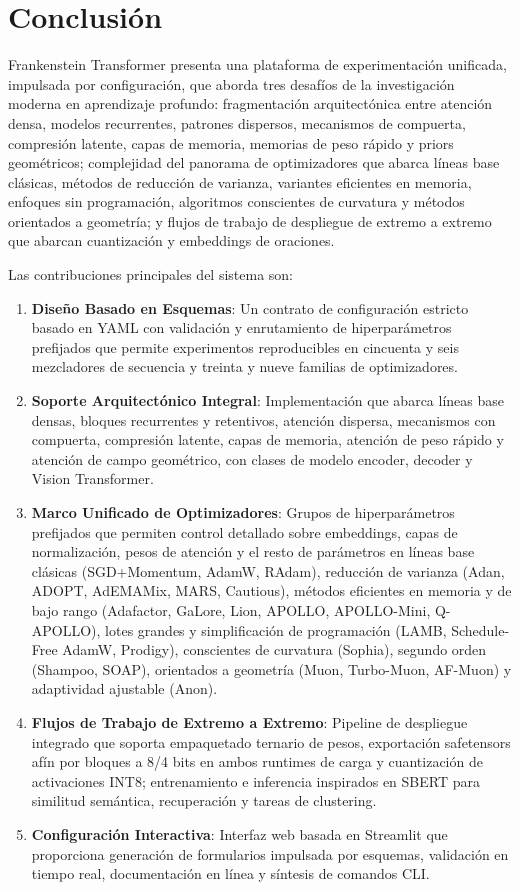 \section{Conclusión}
\label{sec:conclusion}

Frankenstein Transformer presenta una plataforma de experimentación unificada, impulsada por configuración, que aborda tres desafíos de la investigación moderna en aprendizaje profundo: fragmentación arquitectónica entre atención densa, modelos recurrentes, patrones dispersos, mecanismos de compuerta, compresión latente, capas de memoria, memorias de peso rápido y priors geométricos; complejidad del panorama de optimizadores que abarca líneas base clásicas, métodos de reducción de varianza, variantes eficientes en memoria, enfoques sin programación, algoritmos conscientes de curvatura y métodos orientados a geometría; y flujos de trabajo de despliegue de extremo a extremo que abarcan cuantización y embeddings de oraciones.

Las contribuciones principales del sistema son:
\begin{enumerate}[leftmargin=*]
    \item \textbf{Diseño Basado en Esquemas}: Un contrato de configuración estricto basado en YAML con validación y enrutamiento de hiperparámetros prefijados que permite experimentos reproducibles en cincuenta y seis mezcladores de secuencia y treinta y nueve familias de optimizadores.
    \item \textbf{Soporte Arquitectónico Integral}: Implementación que abarca líneas base densas, bloques recurrentes y retentivos, atención dispersa, mecanismos con compuerta, compresión latente, capas de memoria, atención de peso rápido y atención de campo geométrico, con clases de modelo encoder, decoder y Vision Transformer.
    \item \textbf{Marco Unificado de Optimizadores}: Grupos de hiperparámetros prefijados que permiten control detallado sobre embeddings, capas de normalización, pesos de atención y el resto de parámetros en líneas base clásicas (SGD+Momentum, AdamW, RAdam), reducción de varianza (Adan, ADOPT, AdEMAMix, MARS, Cautious), métodos eficientes en memoria y de bajo rango (Adafactor, GaLore, Lion, APOLLO, APOLLO-Mini, Q-APOLLO), lotes grandes y simplificación de programación (LAMB, Schedule-Free AdamW, Prodigy), conscientes de curvatura (Sophia), segundo orden (Shampoo, SOAP), orientados a geometría (Muon, Turbo-Muon, AF-Muon) y adaptividad ajustable (Anon).
    \item \textbf{Flujos de Trabajo de Extremo a Extremo}: Pipeline de despliegue integrado que soporta empaquetado ternario de pesos, exportación safetensors afín por bloques a 8/4 bits en ambos runtimes de carga y cuantización de activaciones INT8; entrenamiento e inferencia inspirados en SBERT para similitud semántica, recuperación y tareas de clustering.
    \item \textbf{Configuración Interactiva}: Interfaz web basada en Streamlit que proporciona generación de formularios impulsada por esquemas, validación en tiempo real, documentación en línea y síntesis de comandos CLI.
\end{enumerate}

